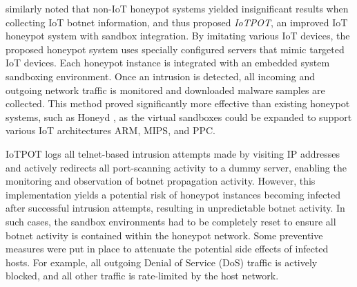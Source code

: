 \citet{PaPa2016} similarly noted that non-IoT honeypot systems yielded insignificant results when collecting IoT botnet information, and thus proposed \textit{IoTPOT}, an improved IoT honeypot system with sandbox integration. By imitating various IoT devices, the proposed honeypot system uses specially configured servers that mimic targeted IoT devices. Each honeypot instance is integrated with an embedded system sandboxing environment. Once an intrusion is detected, all incoming and outgoing network traffic is monitored and downloaded malware samples are collected. This method proved significantly more effective than existing honeypot systems, such as Honeyd \citep{Honeyd2008}, as the virtual sandboxes could be expanded to support various IoT architectures ARM, MIPS, and PPC.

IoTPOT logs all telnet-based intrusion attempts made by visiting IP addresses and actively redirects all port-scanning activity to a dummy server, enabling the monitoring and observation of botnet propagation activity. However, this implementation yields a potential risk of honeypot instances becoming infected after successful intrusion attempts, resulting in unpredictable botnet activity. In such cases, the sandbox environments had to be completely reset to ensure all botnet activity is contained within the honeypot network. Some preventive measures were put in place to attenuate the potential side effects of infected hosts. For example, all outgoing Denial of Service (DoS) traffic is actively blocked, and all other traffic is rate-limited by the host network.

